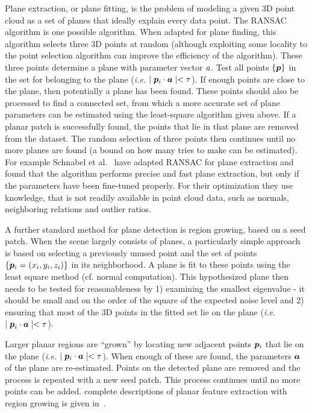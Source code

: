 \documentclass[twocolumn,oneside]{book}
\newcommand{\V}[1]{\vector{#1}}  %
\begin{document}
\begin{itemize}
  Plane extraction, or plane fitting, is the problem of modeling a
  given 3D point cloud as a set of planes that ideally explain every
  data point. The RANSAC algorithm is one possible algorithm. When
  adapted for plane finding, this algorithm selects three 3D points at
  random (although exploiting some locality to the point selection
  algorithm can improve the efficiency of the algorithm). These three
  points determine a plane with parameter vector ${\bf \it a}$.  Test
  all points $\{ \V p \}$ in the set for belonging to the plane
  ({\it i.e.} $\mid \V p_i \cdot \V a \mid < \tau$).  If
  enough points are close to the plane, then potentially a plane has
  been found.  These points should also be processed to find a
  connected set, from which a more accurate set of plane parameters
  can be estimated using the least-square algorithm given above.  If a
  planar patch is successfully found, the points that lie in that
  plane are removed from the dataset.  The random selection of three
  points then continues until no more planes are found (a bound on how
  many tries to make can be estimated). For example Schnabel et
  al.~\cite{Schnabel:2007} have adapted RANSAC for plane extraction
  and found that the algorithm performs precise and fast plane
  extraction, but only if the parameters have been fine-tuned
  properly. For their optimization they use knowledge, that is not
  readily available in point cloud data, such as normals, neighboring
  relations and outlier ratios.

  A further standard method for plane detection is region growing,
  based on a seed patch. When the scene largely consists of planes, a
  particularly simple approach is based on selecting a previously
  unused point and the set of points $\{\V p_i = (x_i,y_i,z_i)\}$ in
  its neighborhood. A plane is fit to these points using the least
  square method (cf. normal computation).  This hypothesized plane
  then needs to be tested for reasonableness by 1) examining the
  smallest eigenvalue - it should be small and on the order of the
  square of the expected noise level and 2) ensuring that most of the
  3D points in the fitted set lie on the plane ({\it i.e.} $\mid
  {\V p}_i \cdot \V a \mid < \tau$).

  Larger planar regions are ``grown'' by locating new adjacent points
  $\V p_i$ that lie on the plane ({\it i.e.} $\mid \V p_i \cdot \V a
  \mid < \tau$).  When enough of these are found, the parameters $\V
  a$ of the plane are re-estimated.  Points on the detected plane
  are removed and the process is repeated with a new seed patch.
  This process continues until no more points can be added.
  complete descriptions of planar feature extraction with region
  growing is given in~\cite{hoover}.


\end{itemize}
\end{document}

